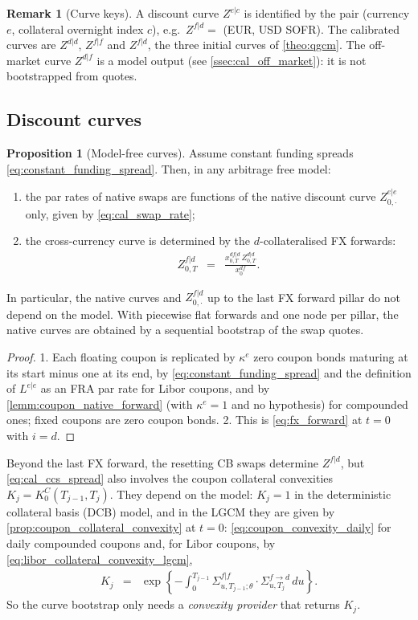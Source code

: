 \documentclass[11pt,english]{amsart}
\theoremstyle{definition}
\newtheorem{prop}{Proposition}
\newtheorem{rema}{Remark}
\begin{document}
\begin{rema}[Curve keys]
A discount curve $Z^{e|c}$ is identified by the pair (currency $e$, collateral overnight index $c$), e.g.\ $Z^{f|d} = $ (EUR, USD SOFR). The calibrated curves are $Z^{d|d}$, $Z^{f|f}$ and $Z^{f|d}$, the three initial curves of \autoref{theo:qgcm}. The off-market curve $Z^{d|f}$ is a model output (see \autoref{ssec:cal_off_market}): it is not bootstrapped from quotes.
\end{rema}


\subsection{Discount curves}

\begin{prop}[Model-free curves]\label{prop:cal_model_free_curves}
Assume constant funding spreads \eqref{eq:constant_funding_spread}. Then, in any arbitrage free model:
\begin{enumerate}
\item the par rates of native swaps are functions of the native discount curve $Z^{e|e}_{0,\cdot}$ only, given by \eqref{eq:cal_swap_rate};
\item the cross-currency curve is determined by the $d$-collateralised FX forwards:
\begin{eqnarray}
  Z^{f|d}_{0,T} &=& \frac{x^{df|d}_{0,T}\, Z^{d|d}_{0,T}}{x^{df}_0} .
\end{eqnarray}
\end{enumerate}
In particular, the native curves and $Z^{f|d}_{0,\cdot}$ up to the last FX forward pillar do not depend on the model. With piecewise flat forwards and one node per pillar, the native curves are obtained by a sequential bootstrap of the swap quotes.
\end{prop}

\begin{proof}
1. Each floating coupon is replicated by $\kappa^e$ zero coupon bonds maturing at its start minus one at its end, by \eqref{eq:constant_funding_spread} and the definition of $L^{e|e}$ as an FRA par rate for Libor coupons, and by \autoref{lemm:coupon_native_forward} (with $\kappa^e = 1$ and no hypothesis) for compounded ones; fixed coupons are zero coupon bonds. 2. This is \eqref{eq:fx_forward} at $t=0$ with $i=d$.
\end{proof}

Beyond the last FX forward, the resetting CB swaps determine $Z^{f|d}$, but \eqref{eq:cal_ccs_spread} also involves the coupon collateral convexities $K_j = K^C_0(T_{j-1},T_j)$. They depend on the model: $K_j = 1$ in the deterministic collateral basis (DCB) model, and in the LGCM they are given by \autoref{prop:coupon_collateral_convexity} at $t=0$: \eqref{eq:coupon_convexity_daily} for daily compounded coupons and, for Libor coupons, by \eqref{eq:libor_collateral_convexity_lgcm},
\begin{eqnarray}
  K_j &=& \exp\left\{ -\int_0^{T_{j-1}} \Sigma^{f|f}_{u,T_{j-1};\theta}\cdot\Sigma^{f\to d}_{u,T_j}\,du \right\} .
  \label{eq:cal_libor_convexity}
\end{eqnarray}
So the curve bootstrap only needs a \emph{convexity provider} that returns $K_j$.
\end{document}
